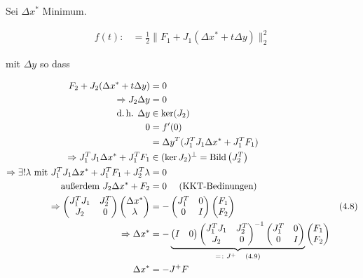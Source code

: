 Sei $\Delta x^*$ Minimum.

\begin{align*}
f(t) \colon&= \frac 12 \| F_1 + J_1 (\Delta x^* + t \Delta y) \|_2^2
\end{align*}

mit $\Delta y$ so dass 

\begin{align*}
F_2 + J_2(\Delta x^* + t \Delta y) &= 0 \\
\Rightarrow J_2 \Delta y &= 0 \\
\text{d.\,h. } \Delta y &\in \ker(J_2) \\
0 &= f'(0) \\
&= \Delta y^T ( J_1^T J_1 \Delta x^* + J_1^T F_1) \\
\Rightarrow J_1^T J_1 \Delta x^* + J_1^T F_1 & \in (\ker J_2)^\perp = \mathrm{Bild} \left(J_2^T\right) \\
\Rightarrow \exists! \lambda \text{ mit } J_1^T J_1 \Delta x^* + J_1^T F_1 + J_2^T \lambda &= 0 \\
\text{außerdem } J_2 \Delta x^* + F_2 &= 0 \quad \text{ (KKT-Bedinungen)} \\
\Rightarrow \begin{pmatrix} J_1^T J_1 & J_2^T \\ J_2 & 0 \end{pmatrix} \begin{pmatrix} \Delta x^* \\ \lambda \end{pmatrix} &= - \begin{pmatrix} J_1^T & 0 \\ 0 & I \end{pmatrix} \begin{pmatrix} F_1 \\ F_2 \end{pmatrix} & (4.8) \\
\Rightarrow \Delta x^* &= - \underbrace{\begin{pmatrix} I & 0 \end{pmatrix} \begin{pmatrix} J_1^T J_1 & J_2^T \\ J_2 & 0 \end{pmatrix}^{-1} \begin{pmatrix} J_1^T & 0 \\ 0 & I \end{pmatrix}}_{=\colon J^+ \quad (4.9)} \begin{pmatrix} F_1 \\ F_2 \end{pmatrix}  \\
\Delta x^* &= - J^+ F \\
\end{align*}


